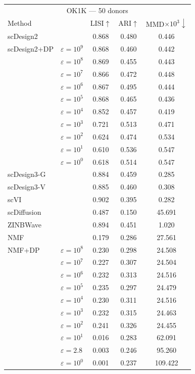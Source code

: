 \begin{tabular}{llccc}
\toprule
\multicolumn{5}{c}{OK1K — 50 donors} \\
Method & & LISI$\uparrow$ & ARI$\uparrow$ & MMD$\times 10^3\downarrow$ \\
\midrule
scDesign2 &  & 0.868 & 0.480 & 0.446 \\
scDesign2+DP & $\varepsilon=10^{9}$ & 0.868 & 0.460 & 0.442 \\
 & $\varepsilon=10^{8}$ & 0.869 & 0.455 & 0.443 \\
 & $\varepsilon=10^{7}$ & 0.866 & 0.472 & 0.448 \\
 & $\varepsilon=10^{6}$ & 0.867 & 0.495 & 0.444 \\
 & $\varepsilon=10^{5}$ & 0.868 & 0.465 & 0.436 \\
 & $\varepsilon=10^{4}$ & 0.852 & 0.457 & 0.419 \\
 & $\varepsilon=10^{3}$ & 0.721 & 0.513 & 0.471 \\
 & $\varepsilon=10^{2}$ & 0.624 & 0.474 & 0.534 \\
 & $\varepsilon=10^{1}$ & 0.610 & 0.536 & 0.547 \\
 & $\varepsilon=10^{0}$ & 0.618 & 0.514 & 0.547 \\
\addlinespace[2pt]
scDesign3-G &  & 0.884 & 0.459 & 0.285 \\
\addlinespace[2pt]
scDesign3-V &  & 0.885 & 0.460 & 0.308 \\
\addlinespace[2pt]
scVI &  & 0.902 & 0.395 & 0.282 \\
\addlinespace[2pt]
scDiffusion &  & 0.487 & 0.150 & 45.691 \\
\addlinespace[2pt]
ZINBWave &  & 0.894 & 0.451 & 1.020 \\
\addlinespace[2pt]
NMF &  & 0.179 & 0.286 & 27.561 \\
\addlinespace[2pt]
NMF+DP & $\varepsilon=10^{8}$ & 0.230 & 0.298 & 24.508 \\
 & $\varepsilon=10^{7}$ & 0.227 & 0.307 & 24.504 \\
 & $\varepsilon=10^{6}$ & 0.232 & 0.313 & 24.516 \\
 & $\varepsilon=10^{5}$ & 0.235 & 0.297 & 24.479 \\
 & $\varepsilon=10^{4}$ & 0.230 & 0.311 & 24.516 \\
 & $\varepsilon=10^{3}$ & 0.232 & 0.315 & 24.463 \\
 & $\varepsilon=10^{2}$ & 0.241 & 0.326 & 24.455 \\
 & $\varepsilon=10^{1}$ & 0.016 & 0.283 & 62.091 \\
 & $\varepsilon=2.8$ & 0.003 & 0.246 & 95.260 \\
 & $\varepsilon=10^{0}$ & 0.001 & 0.237 & 109.422 \\
\bottomrule
\end{tabular}

